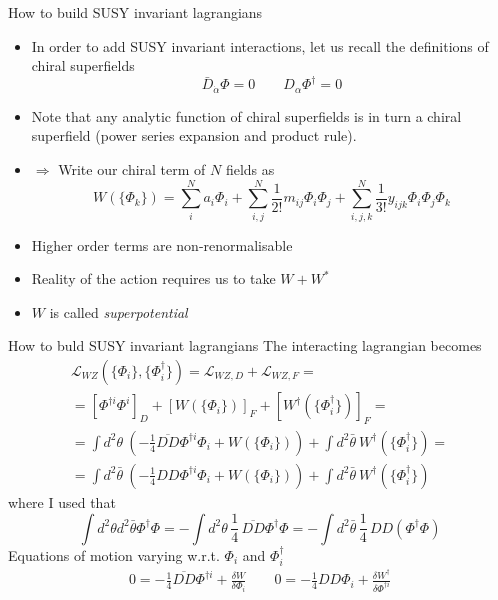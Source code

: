 \documentclass[10pt]{beamer}
\begin{document}
\begin{frame}{How to build SUSY invariant lagrangians}
    \begin{itemize}
        \item In order to add SUSY invariant interactions, let us recall the definitions of chiral superfields 
            \begin{equation*}
                \bar D_{\dot\alpha} \Phi = 0 \qquad D_{\alpha} \Phi^{\dagger} = 0
            \end{equation*}
        \item Note that any analytic function of chiral superfields is in turn a chiral superfield (power series expansion and product rule). \\
        \item $\Rightarrow$ Write our chiral term of $N$ fields as 
            \begin{equation*}
                W(\{\Phi_k\}) = \sum_i^N a_i \Phi_i + \sum_{i,j}^N \frac{1}{2!} m_{ij} \Phi_{i}\Phi_j + \sum_{i,j,k}^N \frac{1}{3!} y_{ijk} \Phi_i \Phi_j \Phi_k
            \end{equation*}
        \item Higher order terms are non-renormalisable \\
        \item Reality of the action requires us to take $W + W^*$
        \item $W$ is called \emph{superpotential}
    \end{itemize}
\end{frame}

\begin{frame}{How to buld SUSY invariant lagrangians}
The interacting lagrangian becomes
\begin{gather*}
\mathcal{L}_{WZ}\left(\{\Phi_i\}, \{\Phi^{\dagger}_i\}\right) = \mathcal{L}_{WZ,D} + \mathcal{L}_{WZ,F} = \\
= \left[\Phi^{\dagger i}\Phi^i\right]_D + \left[W(\{\Phi_i\})\right]_F +  \left[W^{\dagger}(\{\Phi^{\dagger}_i\})\right]_F = \\
= \int d^2\theta \ \left(-\frac{1}{4}\overline{DD}\Phi^{\dagger i}\Phi_i + W(\{\Phi_i\})\right) + \int d^2\bar\theta \ W^{\dagger}(\{\Phi^{\dagger}_i\}) = \\
= \int d^2\bar\theta \ \left(-\frac{1}{4}{DD}\Phi^{\dagger i}\Phi_i + W(\{\Phi_i\})\right) + \int d^2\bar\theta \ W^{\dagger}(\{\Phi^{\dagger}_i\})
\end{gather*}
where I used that 
\begin{equation*}
    \int d^2\theta d^2\bar\theta \Phi^{\dagger}\Phi = - \int d^2\theta \, \frac{1}{4} \, \overline{DD}\Phi^\dagger\Phi = - \int d^2\bar\theta \, \frac{1}{4} \, DD(\Phi^{\dagger}\Phi) 
\end{equation*}
Equations of motion varying w.r.t. $\Phi_i$ and $\Phi_i^{\dagger}$
\begin{gather*}
    0=-\frac{1}{4} \overline{D D} \Phi^{\dagger i}+\frac{\delta W}{\delta \Phi_{i}} \qquad
    0=-\frac{1}{4} D D \Phi_{i}+\frac{\delta W^{\dagger}}{\delta \Phi^{\dagger i}}
\end{gather*}
\end{frame}
\end{document}
